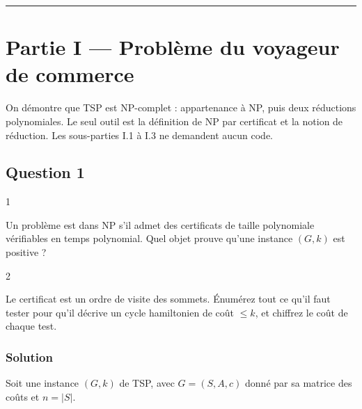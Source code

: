 \documentclass[11pt,a4paper]{article}
\begin{document}
\begin{center}\rule{0.5\linewidth}{0.5pt}\end{center}

\hypertarget{partie-i-probluxe8me-du-voyageur-de-commerce}{%
\section{Partie I --- Problème du voyageur de commerce}\label{partie-i-probluxe8me-du-voyageur-de-commerce}}

On démontre que TSP est NP-complet : appartenance à NP, puis deux réductions polynomiales. Le seul outil est la définition de NP par certificat et la notion de réduction. Les sous-parties I.1 à I.3 ne demandent aucun code.

\hypertarget{question-1}{%
\subsection{Question 1}\label{question-1}}

\begin{indication}{1}

Un problème est dans NP s'il admet des certificats de taille polynomiale vérifiables en temps polynomial. Quel objet prouve qu'une instance \((G,k)\) est positive ?

\end{indication}

\begin{indication}{2}

Le certificat est un ordre de visite des sommets. Énumérez tout ce qu'il faut tester pour qu'il décrive un cycle hamiltonien de coût \(\le k\), et chiffrez le coût de chaque test.

\end{indication}

\hypertarget{solution}{%
\subsubsection{Solution}\label{solution}}

Soit une instance \((G,k)\) de TSP, avec \(G=(S,A,c)\) donné par sa matrice des coûts et \(n=|S|\).
\end{document}
